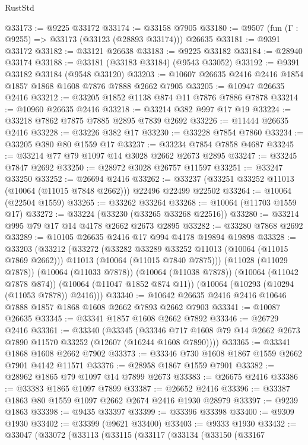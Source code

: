 \begin{lexlean}{RustStd}
\begin{coremodule}
@33173 := @9225 @33172
@33174 := @33158 @7905
@33180 := @9507 (fun (Γ : @9255) => @33173 (@33123 (@28893 @33174))) @26635
@33181 := @9391 @33172
@33182 := @33121 @26638
@33183 := @9225 @33182
@33184 := @28940 @33174
@33188 := @33181 (@33183 @33184) (@9543 @33052)
@33192 := @9391 @33182 @33184 (@9548 @33120)
@33203 := @10607 @26635 @2416 @2416 @1854 @1857 @1868 @1608 @7876 @7888 @2662 @7905
@33205 := @10947 @26635 @2416
@33212 := @33205 @1852 @1138 @874 @11 @7876 @7886 @7878
@33214 := @10960 @26635 @2416
@33218 := @33214 @382 @997 @17 @19
@33224 := @33218 @7862 @7875 @7885 @2895 @7839 @2692
@33226 := @11444 @26635 @2416
@33228 := @33226 @382 @17
@33230 := @33228 @7854 @7860
@33234 := @33205 @380 @80 @1559 @17
@33237 := @33234 @7854 @7858 @4687
@33245 := @33214 @77 @79 @1097 @14 @3028 @2662 @2673 @2895
@33247 := @33245 @7847 @2692
@33250 := @28972 @3028 @26757 @11597
@33251 := @33247 @33250
@33252 := @26694 @2416
@33262 := @33237 (@33251 @33252 @11013 (@10064 (@11015 @7848 @2662))) @22496 @22499 @22502
@33264 := @10064 (@22504 @1559)
@33265 := @33262 @33264
@33268 := @10064 (@11703 @1559 @17)
@33272 := @33224 (@33230 (@33265 @33268 @22516))
@33280 := @33214 @995 @79 @17 @14 @4178 @2662 @2673 @2895
@33282 := @33280 @7868 @2692
@33289 := @10105 @26635 @2416 @17 @994 @4178 @19894 @19898
@33328 := @33203
    (@33212
      (@33272
        (@33282 @33289 @33252 @11013 (@10064 (@11015 @7869 @2662)))
        @11013
        (@10064 (@11015 @7840 @7875)))
      (@11028 (@11029 @7878))
      (@10064 (@11033 @7878))
      (@10064 (@11038 @7878))
      (@10064 (@11042 @7878 @874))
      (@10064 (@11047 @1852 @874 @11))
      (@10064 (@10293 (@10294 (@11053 @7878)) @2416)))
@33340 := @10642 @26635 @2416 @2416 @10646 @7888 @1857 @1868 @1608 @2662 @7893 @2662 @7903
@33341 := @10087 @26635
@33345 := @33341 @1857 @1608 @2662 @7892
@33346 := @26729 @2416
@33361 := @33340
    (@33345
      (@33346 @717 @1608 @79 @14 @2662 @2673 @7890 @11570 @33252 (@12607 (@16244 @1608 @7890))))
@33365 := @33341 @1868 @1608 @2662 @7902
@33373 := @33346 @730 @1608 @1867 @1559 @2662 @7901 @4142 @11571
@33376 := @28958 @1867 @1559 @7901
@33382 := @28962 @1865 @79 @1097 @14 @7899 @2673
@33383 := @26675 @2416
@33386 := @33383 @1865 @1097 @7899
@33387 := @26652 @2416
@33396 := @33387 @1863 @80 @1559 @1097 @2662 @2674 @2416 @1930 @28979
@33397 := @9239 @1863
@33398 := @9435 @33397
@33399 := @33396 @33398
@33400 := @9309 @1930
@33402 := @33399 (@9621 @33400)
@33403 := @9333 @1930
@33432 := @33047
    (@33072
      (@33113
        (@33115
          (@33117
            (@33134
              (@33150
                (@33167

\end{coremodule}
\end{lexlean}
